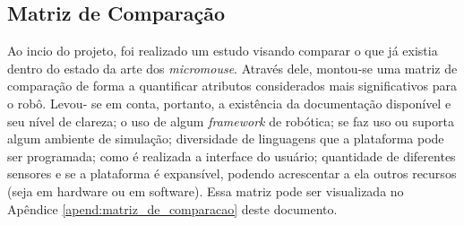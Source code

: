 \subsection{Matriz de Comparação}

Ao incio do projeto, foi realizado um estudo visando comparar o que já existia dentro do estado da arte dos \textit{micromouse}. Através dele, montou-se uma matriz de comparação de forma a
quantificar atributos considerados mais significativos para o robô. Levou- se em conta, portanto, a existência da documentação disponível e seu nível de clareza; o uso de algum \textit{framework} de robótica; se faz uso ou suporta algum ambiente de simulação; diversidade de linguagens que a
plataforma pode ser programada; como é realizada a interface do usuário; quantidade de diferentes sensores e se a plataforma é expansível, podendo acrescentar a ela outros recursos (seja em hardware ou em software). Essa matriz pode ser visualizada no Apêndice \ref{apend:matriz_de_comparacao} deste documento.